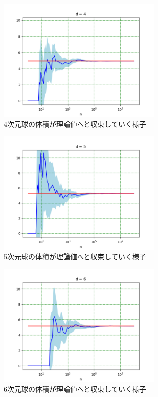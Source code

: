 \documentclass[a4paper,twoside]{jarticle}
\begin{document}
\begin{figure}[H]
\begin{center}
\includegraphics[width=8cm]{../python/report1_monte_carlo/out/r2plot4d.png}
\end{center}
\caption{4次元球の体積が理論値へと収束していく様子}
\end{figure}

\begin{figure}[H]
\begin{center}
\includegraphics[width=8cm]{../python/report1_monte_carlo/out/r2plot5d.png}
\end{center}
\caption{5次元球の体積が理論値へと収束していく様子}
\end{figure}

\begin{figure}[H]
\begin{center}
\includegraphics[width=8cm]{../python/report1_monte_carlo/out/r2plot6d.png}
\end{center}
\caption{6次元球の体積が理論値へと収束していく様子}
\end{figure}
\end{document}
